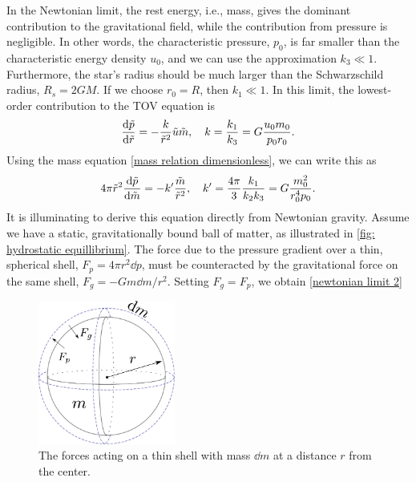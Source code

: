 In the Newtonian limit, the rest energy, i.e., mass, gives the dominant contribution to the gravitational field, while the contribution from pressure is negligible. 
In other words, the characteristic pressure, $p_0$, is far smaller than the characteristic energy density $u_0$, and we can use the approximation $k_3 \ll 1$.
Furthermore, the star's radius should be much larger than the Schwarzschild radius, $R_s = 2 G M$.
If we choose $r_0 = R$, then $ k_1 \ll 1$.
In this limit, the lowest-order contribution to the TOV equation is
%
\begin{equation}
    \label{Newtonian limit TOV}
    \odv{\tilde p}{\tilde r} = - \frac{k}{\tilde r^2}\tilde u \tilde m, \quad
    k = \frac{k_1}{k_3} =  G \frac{u_0 m_0}{p_0 r_0}.
\end{equation}
%
Using the mass equation \autoref{mass relation dimensionless}, we can write this as
%
\begin{equation}
    \label{newtonian limit 2}
    4 \pi \tilde r^2 \odv{\tilde p}{\tilde m}
    = - k' \frac{\tilde m}{\tilde r^2}, 
    \quad k' = \frac{4 \pi}{3} \frac{k_1}{k_2 k_3} = G \frac{m_0^2}{r_0^4 p_0}.
\end{equation}
%
It is illuminating to derive this equation directly from Newtonian gravity.
Assume we have a static, gravitationally bound ball of matter, as illustrated in \autoref{fig: hydrostatic equillibrium}.
The force due to the pressure gradient over a thin, spherical shell, $F_p = 4 \pi r^2 \dd p$, must be counteracted by the gravitational force on the same shell, $F_g = - G m \dd m / r^2$.
Setting $F_g = F_p$, we obtain \autoref{newtonian limit 2}

\begin{figure}[h]
    \centering
    \includegraphics[width=0.4\textwidth]{figurer/hydrostatic_equillibrium.pdf}
    \caption{The forces acting on a thin shell with mass $\dd m$ at a distance $r$ from the center.}
    \label{fig: hydrostatic equillibrium}
\end{figure}

